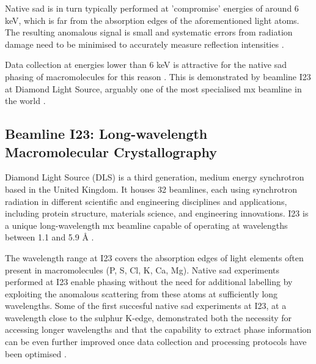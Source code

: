 Native \ac{sad} is in turn typically performed at 'compromise' energies of around 6 \unit{keV}, which is far from the absorption edges of the aforementioned light atoms. The resulting anomalous signal is small and systematic errors from radiation damage need to be minimised to accurately measure reflection intensities \cite{DjinovicCarugo2005}.%


Data collection at energies lower than 6 \unit{keV} is attractive for the native \ac{sad} phasing of macromolecules for this reason \cite{Omari2023}. This is demonstrated %
by beamline I23 at Diamond Light Source, arguably one of the most specialised \ac{mx} beamline in the world \cite{Foerster2019}. %

\subsection{Beamline I23: Long-wavelength Macromolecular Crystallography}

Diamond Light Source (DLS) is a third generation, medium energy synchrotron based in the United Kingdom. It houses 32 beamlines, each using synchrotron radiation in different scientific and engineering disciplines and applications, including protein structure, materials science, and engineering innovations.
I23 is a unique long-wavelength \ac{mx} beamline capable of operating at wavelengths between 1.1 and 5.9 Å \cite{Wagner2016}.

The wavelength range at I23 covers the absorption edges of
light elements often present in macromolecules (P, S, Cl, K, Ca, Mg).
Native \ac{sad} experiments performed at I23 enable phasing without the need for additional labelling by exploiting the anomalous scattering from these atoms at sufficiently long wavelengths. Some of the first succesful native \ac{sad} experiments at I23, at a wavelength close to the sulphur K-edge, demonstrated both the necessity for accessing longer wavelengths and that the capability to extract phase information can be even further improved once data collection and processing protocols have been optimised \cite{Aurelius2017}.

